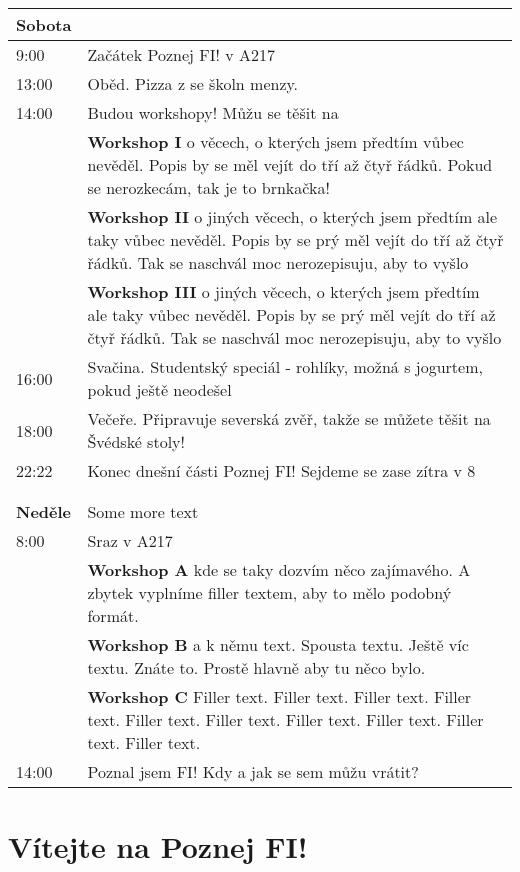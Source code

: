 \documentclass[]{article}
\begin{document}
\begin{tabularx}{\textwidth}{lX}
    \textbf{Sobota} &  \\ \hline
    9:00 & Začátek Poznej FI! v A217 \\
    13:00 & Oběd. Pizza z se školn menzy. \\
    14:00 & Budou workshopy! Můžu se těšit na \\
    & \textbf{Workshop I} o věcech, o kterých jsem předtím vůbec nevěděl. Popis by se měl vejít do tří až čtyř řádků. Pokud se nerozkecám, tak je to brnkačka! \\
    & \textbf{Workshop II} o jiných věcech, o kterých jsem předtím ale taky vůbec nevěděl. Popis by se prý měl vejít do tří až čtyř řádků. Tak se naschvál moc nerozepisuju, aby to vyšlo \\
    & \textbf{Workshop III} o jiných věcech, o kterých jsem předtím ale taky vůbec nevěděl. Popis by se prý měl vejít do tří až čtyř řádků. Tak se naschvál moc nerozepisuju, aby to vyšlo \\
    16:00 & Svačina. Studentský speciál - rohlíky, možná s jogurtem, pokud ještě neodešel \\
    18:00 & Večeře. Připravuje severská zvěř, takže se můžete těšit na Švédské stoly! \\
    22:22 & Konec dnešní části Poznej FI! Sejdeme se zase zítra v 8 \\
    & \\ 
    & \\ 
    \textbf{Neděle} & Some more text \\ \hline
    8:00 & Sraz v A217 \\
    & \textbf{Workshop A} kde se taky dozvím něco zajímavého. A zbytek vyplníme filler textem, aby to mělo podobný formát. \\
    & \textbf{Workshop B} a k němu text. Spousta textu. Ještě víc textu. Znáte to. Prostě hlavně aby tu něco bylo. \\
    & \textbf{Workshop C} Filler text. Filler text. Filler text. Filler text. Filler text. Filler text. Filler text. Filler text. Filler text. Filler text. \\
    14:00 & Poznal jsem FI! Kdy a jak se sem můžu vrátit? \\
\end{tabularx}


\pagebreak
\section*{Vítejte na Poznej FI!}
\end{document}
